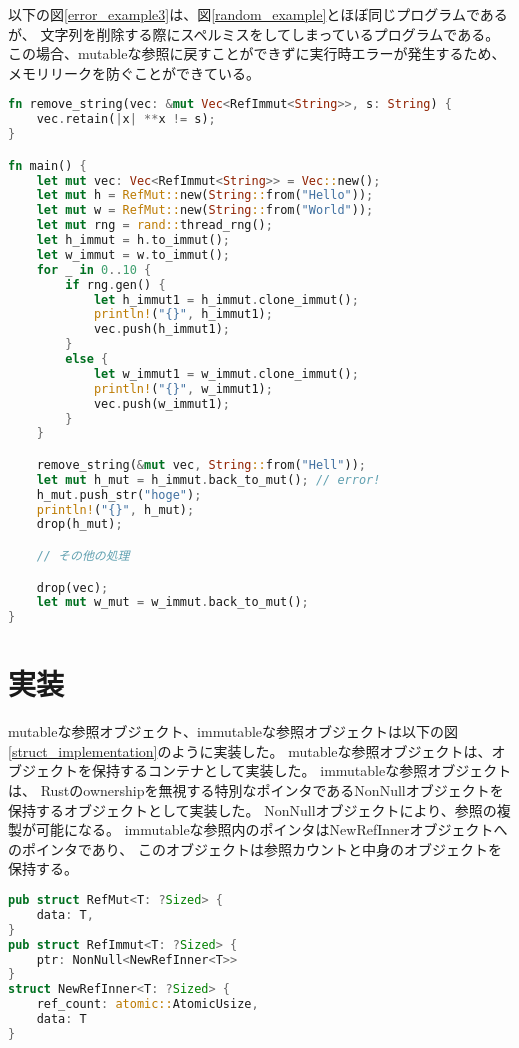 \documentclass{sumiilab-paper}
\theoremstyle{mystyle}
\numberwithin{definition}{chapter} %
\begin{document}
以下の図\ref{error_example3}は、図\ref{random_example}とほぼ同じプログラムであるが、
文字列を削除する際にスペルミスをしてしまっているプログラムである。
この場合、mutableな参照に戻すことができずに実行時エラーが発生するため、
メモリリークを防ぐことができている。
\begin{lstlisting}[language=Rust, caption=mutableな参照へ戻せないことを検出する例, 
  label=error_example3, captionpos=b]
  fn remove_string(vec: &mut Vec<RefImmut<String>>, s: String) {
    vec.retain(|x| **x != s);
}

fn main() {
    let mut vec: Vec<RefImmut<String>> = Vec::new();
    let mut h = RefMut::new(String::from("Hello"));
    let mut w = RefMut::new(String::from("World"));
    let mut rng = rand::thread_rng();
    let h_immut = h.to_immut();
    let w_immut = w.to_immut();
    for _ in 0..10 {
        if rng.gen() {
            let h_immut1 = h_immut.clone_immut();
            println!("{}", h_immut1);
            vec.push(h_immut1);
        }
        else {
            let w_immut1 = w_immut.clone_immut();
            println!("{}", w_immut1);
            vec.push(w_immut1);
        }
    }

    remove_string(&mut vec, String::from("Hell"));
    let mut h_mut = h_immut.back_to_mut(); // error!
    h_mut.push_str("hoge");
    println!("{}", h_mut);
    drop(h_mut);

    // その他の処理

    drop(vec);
    let mut w_mut = w_immut.back_to_mut();
}
\end{lstlisting}

\section{実装}
mutableな参照オブジェクト、immutableな参照オブジェクトは以下の図\ref{struct_implementation}のように実装した。
mutableな参照オブジェクトは、オブジェクトを保持するコンテナとして実装した。
immutableな参照オブジェクトは、
Rustのownershipを無視する特別なポインタであるNonNullオブジェクトを保持するオブジェクトとして実装した。
NonNullオブジェクトにより、参照の複製が可能になる。
immutableな参照内のポインタはNewRefInnerオブジェクトへのポインタであり、
このオブジェクトは参照カウントと中身のオブジェクトを保持する。
\begin{lstlisting}[language=Rust, caption=新たな参照オブジェクトの実装, label=struct_implementation, captionpos=b]
pub struct RefMut<T: ?Sized> {
    data: T,
}
pub struct RefImmut<T: ?Sized> {
    ptr: NonNull<NewRefInner<T>>
}
struct NewRefInner<T: ?Sized> {
    ref_count: atomic::AtomicUsize,
    data: T
}
\end{lstlisting}
\end{document}
